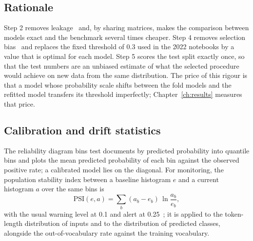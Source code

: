 \subsection{Rationale}
Step 2 removes leakage~\cite{kaufman2012} and, by sharing matrices, makes the comparison between models exact and the benchmark several times cheaper. Step 4 removes selection bias~\cite{cawley2010} and replaces the fixed threshold of 0.3 used in the 2022 notebooks by a value that is optimal for each model. Step 5 scores the test split exactly once, so that the test numbers are an unbiased estimate of what the selected procedure would achieve on new data from the same distribution. The price of this rigour is that a model whose probability scale shifts between the fold models and the refitted model transfers its threshold imperfectly; Chapter~\ref{ch:results} measures that price.

\subsection{Calibration and drift statistics}
The reliability diagram bins test documents by predicted probability into quantile bins and plots the mean predicted probability of each bin against the observed positive rate; a calibrated model lies on the diagonal. For monitoring, the population stability index between a baseline histogram $e$ and a current histogram $a$ over the same bins is
\begin{equation}
\mathrm{PSI}(e, a) = \sum_b (a_b - e_b)\,\ln\frac{a_b}{e_b},
\end{equation}
with the usual warning level at 0.1 and alert at 0.25~\cite{siddiqi2006}; it is applied to the token-length distribution of inputs and to the distribution of predicted classes, alongside the out-of-vocabulary rate against the training vocabulary.
